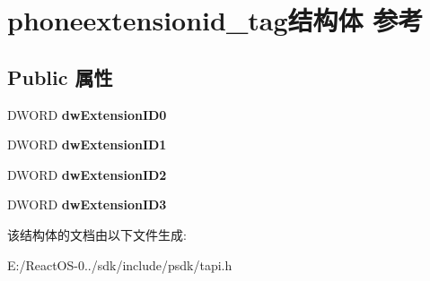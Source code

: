 \hypertarget{structphoneextensionid__tag}{}\section{phoneextensionid\+\_\+tag结构体 参考}
\label{structphoneextensionid__tag}
\subsection*{Public 属性}
\begin{DoxyCompactItemize}
\item 
\mbox{\label{structphoneextensionid__tag_aaff45cc0d64f53401bc4a81a5d5d2dc3}} 
D\+W\+O\+RD {\bfseries dw\+Extension\+I\+D0}
\item 
\mbox{\label{structphoneextensionid__tag_a7819b9371db0d2f195bc0741ab193042}} 
D\+W\+O\+RD {\bfseries dw\+Extension\+I\+D1}
\item 
\mbox{\label{structphoneextensionid__tag_adf90dd3aac29e6c6094efef817042441}} 
D\+W\+O\+RD {\bfseries dw\+Extension\+I\+D2}
\item 
\mbox{\label{structphoneextensionid__tag_a911e6e6fa1834550f728855fb56617e9}} 
D\+W\+O\+RD {\bfseries dw\+Extension\+I\+D3}
\end{DoxyCompactItemize}


该结构体的文档由以下文件生成\+:\begin{DoxyCompactItemize}
\item 
E\+:/\+React\+O\+S-\/0../sdk/include/psdk/tapi.\+h\end{DoxyCompactItemize}
